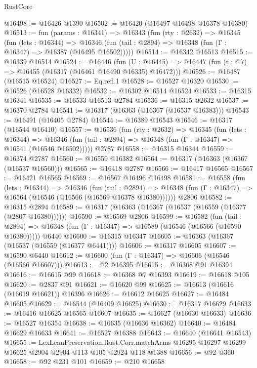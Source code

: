 \begin{lexlean}{RustCore}
\begin{coremodule}
@16498 := @16426 @1390
@16502 := @16420 (@16497 @16498 @16378 @16380)
@16513 := fun (params : @16341) =>
  @16343
    (fun (rty : @2632) =>
    @16345
      (fun (lets : @16344) =>
      @16346 (fun (tail : @2894) => @16348 (fun (Γ : @16347) => @16387 (@16495 @16502)))))
@16514 := @16342 @16513
@16515 := @16339 @16514
@16524 := @16446
    (fun (U : @16445) => @16447 (fun (t : @7) => @16455 (@16317 (@16461 @16490 @16335) @16472)))
@16526 := @16487 (@16515 @16524)
@16527 := Eq.refl.{1}
@16528 := @16527 @16320
@16530 := @16526 (@16528 @16332)
@16532 := @16302 @16514 @16524
@16533 := @16315 @16341
@16535 := @16533 @16513 @2784
@16536 := @16315 @2632
@16537 := @16370 @2784
@16541 := @16317 (@16363 (@16367 (@16537 @16383)))
@16543 := @16491 (@16405 @2784)
@16544 := @16389 @16543
@16546 := @16317 (@16544 @16410)
@16557 := @16536
    (fun (rty : @2632) =>
    @16345
      (fun (lets : @16344) =>
      @16346 (fun (tail : @2894) => @16348 (fun (Γ : @16347) => @16541 (@16546 @16502)))))
    @2787
@16558 := @16315 @16344
@16559 := @16374 @2787
@16560 := @16559 @16382
@16564 := @16317 (@16363 (@16367 (@16537 @16560)))
@16565 := @16418 @2787
@16566 := @16417 @16565
@16567 := @16421 @16565
@16569 := @16567 @16496 @16498
@16581 := @16558
    (fun (lets : @16344) =>
    @16346
      (fun (tail : @2894) =>
      @16348 (fun (Γ : @16347) => @16564 (@16546 (@16566 (@16569 @16378 @16380))))))
    @2806
@16582 := @16315 @2894
@16589 := @16317 (@16363 (@16367 (@16537 (@16559 (@16377 (@2807 @16380))))))
@16590 := @16569 @2806
@16599 := @16582
    (fun (tail : @2894) => @16348 (fun (Γ : @16347) => @16589 (@16546 (@16566 (@16590 @16380)))))
    @6440
@16600 := @16315 @16347
@16605 := @16363 (@16367 (@16537 (@16559 (@16377 @6441))))
@16606 := @16317 @16605
@16607 := @16590 @6440
@16612 := @16600 (fun (Γ : @16347) => @16606 (@16546 (@16566 @16607)))
@16613 := @2 @16395
@16615 := @16368 @91 @16394
@16616 := @16615 @99
@16618 := @16368 @7 @16393
@16619 := @16618 @105
@16620 := @2837 @91
@16621 := @16620 @99
@16625 := @16613 (@16616 (@16619 @16621)) @16396
@16626 := @16612 @16625
@16627 := @16484 @16605
@16629 := @16544 (@16409 @16625)
@16630 := @16317 @16629
@16633 := @16416 @16625 @16565 @16607
@16635 := @16627 (@16630 @16633)
@16636 := @16527 @16354
@16638 := @16635 (@16636 @16362)
@16640 := @16484 @16629 @16633
@16641 := @16527 @16388
@16643 := @16640 (@16641 @16543)
@16655 := LexLeanPreservation.Rust.Corr.matchArms
    @16295
    @16297
    @16299
    @16625
    @2904
    @2904
    @113
    @105
    @2924
    @118
    @1388
@16656 := @92 @360
@16658 := @92 @231 @101
@16659 := @210 @16658

\end{coremodule}
\end{lexlean}
